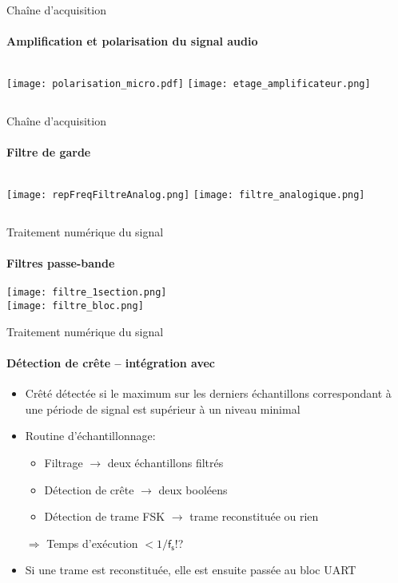 \begin{frame}
  \tableofcontents[currentsection]
\end{frame}

\begin{frame}{Chaîne d'acquisition}
  \framesubtitle{Amplification et polarisation du signal audio}
  \begin{columns}[c]
  \vspace{4.5cm}
  \texttt{[image: polarisation\_micro.pdf]}
  \texttt{[image: etage\_amplificateur.png]}
  \end{columns}
\end{frame}

\begin{frame}{Chaîne d'acquisition}
  \framesubtitle{Filtre de garde}
  \begin{columns}[c]
  \texttt{[image: repFreqFiltreAnalog.png]}
  \texttt{[image: filtre\_analogique.png]}
  \end{columns}
\end{frame}

\begin{frame}{Traitement numérique du signal}
  \framesubtitle{Filtres passe-bande}
  \begin{center}
  \texttt{[image: filtre\_1section.png]}\\
  \texttt{[image: filtre\_bloc.png]}
  \end{center}
\end{frame}

\begin{frame}{Traitement numérique du signal}
  \framesubtitle{Détection de crête -- intégration avec }
  \begin{itemize}
    \item Crêté détectée si le maximum sur les derniers échantillons correspondant à une période de signal est supérieur à un niveau minimal
    \item Routine d'échantillonnage:
    \begin{itemize}
      \item Filtrage $\rightarrow$ deux échantillons filtrés
      \item Détection de crête $\rightarrow$ deux booléens
      \item Détection de trame FSK $\rightarrow$ trame reconstituée ou rien
    \end{itemize}
    {\large $\Rightarrow$ Temps d'exécution $<1/\mathsf{f_s}$!?}
    \item Si une trame est reconstituée, elle est ensuite passée au bloc UART
  \end{itemize}
\end{frame}



